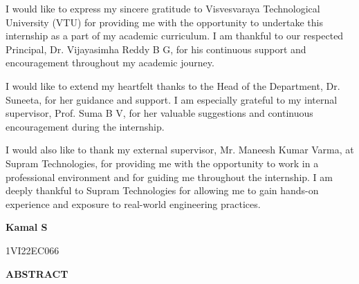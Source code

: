 \documentclass[12pt,a4paper]{report}
\begin{document}
\vspace{0.5cm}
\setlength{\parindent}{1.5em}
\begin{onehalfspacing}

I would like to express my sincere gratitude to Visvesvaraya Technological University (VTU) for providing me with the opportunity to undertake this internship as a part of my academic curriculum. I am thankful to our respected Principal, Dr. Vijayasimha Reddy B G, for his continuous support and encouragement throughout my academic journey.


I would like to extend my heartfelt thanks to the Head of the Department, Dr. Suneeta, for her guidance and support. I am especially grateful to my internal supervisor, Prof. Suma B V, for her valuable suggestions and continuous encouragement during the internship.


I would also like to thank my external supervisor, Mr. Maneesh Kumar Varma, at Supram Technologies, for providing me with the opportunity to work in a professional environment and for guiding me throughout the internship. I am deeply thankful to Supram Technologies for allowing me to gain hands-on experience and exposure to real-world engineering practices.

\end{onehalfspacing}

\vspace{1cm}
\begin{flushright}
\textbf{Kamal S}\par
1VI22EC066\par
\end{flushright}

\newpage
\begin{center}
{\LARGE \textbf{ABSTRACT}\par}
\end{center}

\vspace{0.5cm}
\setlength{\parindent}{1.5em}
\end{document}
